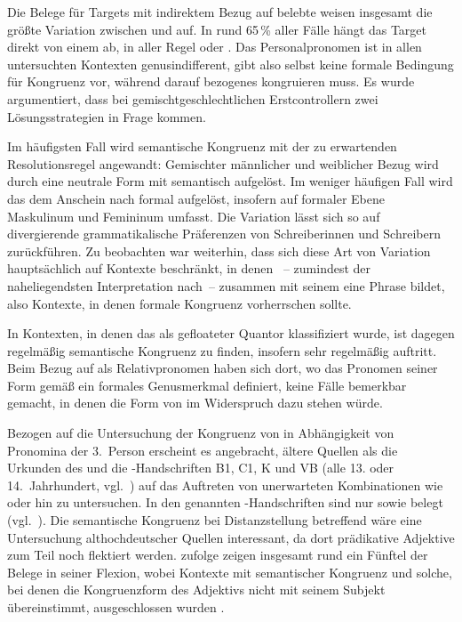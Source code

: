 Die Belege für Targets mit indirektem Bezug auf belebte
 weisen insgesamt die größte Variation zwischen
 und  auf. In rund 65\,\% aller Fälle hängt das Target
direkt von einem  ab, in aller Regel  
oder  . Das Personalpronomen ist in allen untersuchten
Kontexten genus\-indifferent, gibt also selbst keine
formale Bedingung für Kongruenz vor, während darauf bezogenes
 kongruieren muss. Es wurde argumentiert, dass bei
gemischtgeschlechtlichen Erstcontrollern zwei Lösungsstrategien in Frage
kommen.

Im häufigsten Fall wird semantische Kongruenz mit der
zu erwartenden Resolutionsregel angewandt: Gemischter männlicher und weiblicher
Bezug wird durch eine neutrale Form mit \mbox{} semantisch aufgelöst.
Im weniger häufigen Fall wird das  dem Anschein nach formal
aufgelöst, insofern  auf formaler Ebene Maskulinum und Femininum
umfasst. Die Variation lässt sich so auf divergierende grammatikalische
Präferenzen von Schreiberinnen und Schreibern zurück\-führen. Zu beobachten war
weiterhin, dass sich diese Art von Variation hauptsächlich auf Kontexte
beschränkt, in denen ~-- zumindest der naheliegendsten
Interpretation nach~-- zusammen mit seinem  eine Phrase
bildet, also Kontexte, in denen formale
Kongruenz vorherrschen sollte.

In Kontexten, in denen das  als gefloateter Quantor
klassifiziert wurde, ist dagegen regelmäßig semantische
Kongruenz zu finden, insofern sehr regelmäßig
 auftritt. Beim Bezug auf  als
Relativpronomen haben sich dort, wo das Pronomen seiner
Form gemäß ein formales Genusmerkmal definiert, keine Fälle
bemerkbar gemacht, in denen die Form von  im Widerspruch dazu
stehen würde.

Bezogen auf die Untersuchung der Kongruenz von  in Abhängigkeit von
Pro\-nomina der 3.~Person erscheint es angebracht, ältere Quellen
als die Urkunden des \CAO{} und die \KC{}-Handschriften B1, C1, K und VB (alle
13. oder 14.~Jahrhundert, vgl.~) auf das Auftreten von
unerwarteten Kombinationen wie  oder  hin zu
untersuchen. In den genannten \KC{}-Handschriften sind nur 
sowie  belegt (vgl.~). Die
semantische Kongruenz bei Distanz\-stellung
betreffend wäre eine Untersuchung althochdeutscher Quellen
interessant, da dort prädikative Adjektive zum Teil
noch flektiert werden.
\citet[310--311]{fleischer2007} zufolge zeigen insgesamt rund ein Fünftel der
Belege in seiner  Flexion, wobei Kontexte mit semantischer
Kongruenz und solche, bei denen die Kongruenzform des Adjektivs nicht mit
seinem Subjekt übereinstimmt, ausgeschlossen wurden
\autocite[304]{fleischer2007}.

